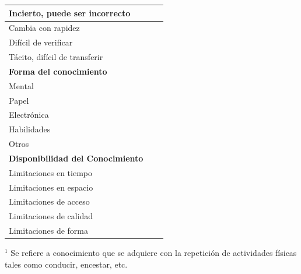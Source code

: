 \documentclass[12pt,a4paper,twoside,spanish]{article}      %
\newcommand{\PreserveBackslash}[1]{\let\temp=\\#1\let\\=\temp}
\let\PBS=\PreserveBackslash
\begin{document}
\begin{table}[H]
\begin{tabularx}{\textwidth}{|p{5cm}|>{\PBS\raggedright}p{0.8cm}|X|}
                Incierto, puede ser incorrecto & & \\ \hline 
                
                Cambia con rapidez& & \\ \hline 
                
                Difícil de verificar& & \\ \hline 
                
                Tácito, difícil de transferir& & \\ \hline 
                
                \textbf{Forma del conocimiento} & &\\ \hline
                
                Mental& & \\ \hline
                
                Papel& & \\ \hline 
                
                Electrónica& & \\ \hline
                
                Habilidades& & \\ \hline 
                
                Otros& & \\ \hline 
                
                \textbf{Disponibilidad del Conocimiento} &  &\\ \hline 
                
                Limitaciones en tiempo& & \\ \hline
                
                Limitaciones en espacio& & \\ \hline 
                
                Limitaciones de acceso& & \\ \hline Limitaciones de calidad& & 
                
                \\ \hline Limitaciones de forma& & \\ \hline
                
            \end{tabularx}
              \label{tab.TM2}
        \end{table}
        
        {\scriptsize \noindent $^1$ Se refiere a conocimiento que se
        adquiere con la repetición de actividades físicas tales como
        conducir, encestar, etc.}
        
\end{document}
